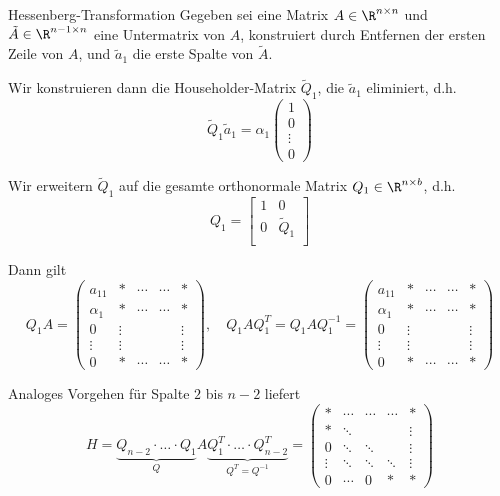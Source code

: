 \begin{defi}{Hessenberg-Transformation}
    Gegeben sei eine Matrix $A \in \R^{n \times n}$ und $\tilde{A} \in \R^{n-1 \times n}$ eine Untermatrix von $A$, konstruiert durch Entfernen der ersten Zeile von $A$, und $\tilde{a}_1$ die erste Spalte von $\tilde{A}$.

    Wir konstruieren dann die Householder-Matrix $\tilde{Q}_1$, die $\tilde{a}_1$ eliminiert, d.h.
    \[
        \tilde{Q}_1 \tilde{a}_1 = \alpha_1 \begin{pmatrix}
            1 \\ 0 \\ \vdots \\ 0
        \end{pmatrix}
    \]

    Wir erweitern $\tilde{Q}_1$ auf die gesamte orthonormale Matrix $Q_1 \in \R^{n \times b}$, d.h.
    \[
        Q_1 = \begin{bmatrix}
            1 & 0           \\
            0 & \tilde{Q}_1 \\
        \end{bmatrix}
    \]

    Dann gilt
    \[
        Q_1 A = \begin{pmatrix}
            a_{11}   & *      & \cdots & \cdots & *      \\
            \alpha_1 & *      & \cdots & \cdots & *      \\
            0        & \vdots &        &        & \vdots \\
            \vdots   & \vdots &        &        & \vdots \\
            0        & *      & \cdots & \cdots & *
        \end{pmatrix}
        , \quad
        Q_1 A Q_1^T = Q_1 A Q_1^{-1} = \begin{pmatrix}
            a_{11}   & *      & \cdots & \cdots & *      \\
            \alpha_1 & *      & \cdots & \cdots & *      \\
            0        & \vdots &        &        & \vdots \\
            \vdots   & \vdots &        &        & \vdots \\
            0        & *      & \cdots & \cdots & *
        \end{pmatrix}
    \]

    Analoges Vorgehen für Spalte $2$ bis $n-2$ liefert
    \[
        H = \underbrace{Q_{n-2} \cdot \ldots \cdot Q_1}_{Q} A \underbrace{Q_1^T \cdot \ldots \cdot Q_{n-2}^T}_{Q^T = Q^{-1}} = \begin{pmatrix}
            *      & \cdots & \cdots & \cdots & *      \\
            *      & \ddots &        &        & \vdots \\
            0      & \ddots & \ddots &        & \vdots \\
            \vdots & \ddots & \ddots & \ddots & \vdots \\
            0      & \cdots & 0      & *      & *
        \end{pmatrix}
    \]


\end{defi}
